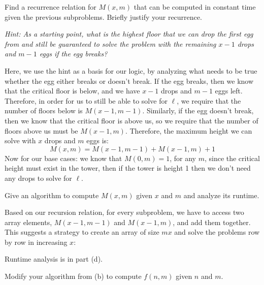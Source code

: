 \documentclass[11pt]{article}
\begin{document}
\begin{subparts}

\item  Find a recurrence relation for $M(x, m)$ that can be computed in constant time given the previous subproblems. Briefly justify your recurrence.

\emph{Hint: As a starting point, what is the highest floor that we can drop the first egg from and still be guaranteed to solve the problem with the remaining $x-1$ drops and $m-1$ eggs if the egg breaks?}

	\begin{solution}
		Here, we use the hint as a basis for our logic, by analyzing what needs to be true whether the egg 
		either breaks or doesn't break. If the egg breaks, then we know that the critical floor is below,
		and we have $x-1$ drops and $m-1$ eggs left. Therefore, in order for us to still be able to solve 
		for \(\ell\), we require that the number of floors below is \(M(x-1, m-1)\). Similarly, if the egg 
		doesn't break, then we know that the critical floor is above us, so we require that the number of 
		floors above us must be \(M(x-1, m)\). Therefore, the maximum height we can solve with \(x\) drops 
		and \(m\) eggs is:
		\[
		M(x, m) = M(x-1, m-1) + M(x-1, m) +1 
		\] 
		Now for our base cases: we know that $M(0, m) = 1$, for any \(m\), since the critical height must exist 
		in the tower, then if the tower is height 1 then we don't need any drops to solve for \(\ell\). 
	\end{solution}
\item  Give an algorithm to compute $M(x, m)$ given $x$ and $m$ and analyze its runtime. 

	\begin{solution}
		Based on our recursion relation, for every subproblem, we have to access two array 
		elements, $M(x-1, m-1)$ and \(M(x-1, m)\), and add them together. This suggests a strategy to create 
		an array of size \(mx\) and solve the problems row by row in increasing \(x\):
		\begin{center}
		\end{center}
		Runtime analysis is in part (d). 
	\end{solution}
\item  Modify your algorithm from (b) to compute $f(n, m)$ given $n$ and $m$.  


\end{subparts}
\end{document}
